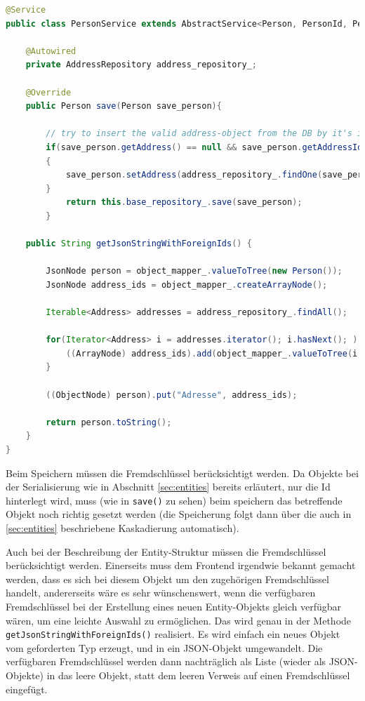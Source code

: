 \scriptsize
\begin{lstlisting}[caption=PersonService.java, label=cs:PersonService, language=Java]
@Service
public class PersonService extends AbstractService<Person, PersonId, PersonRepository>{

	@Autowired
	private AddressRepository address_repository_;
	
	@Override
	public Person save(Person save_person){
	
		// try to insert the valid address-object from the DB by it's id (from JSON)
		if(save_person.getAddress() == null && save_person.getAddressId() != null)
		{
			save_person.setAddress(address_repository_.findOne(save_person.getAddressId()));
		}
			return this.base_repository_.save(save_person);
		}
	
	public String getJsonStringWithForeignIds() {
	
		JsonNode person = object_mapper_.valueToTree(new Person());
		JsonNode address_ids = object_mapper_.createArrayNode();
		
		Iterable<Address> addresses = address_repository_.findAll();
		
		for(Iterator<Address> i = addresses.iterator(); i.hasNext(); ) {
			((ArrayNode) address_ids).add(object_mapper_.valueToTree(i.next().getId()));
		}
		
		((ObjectNode) person).put("Adresse", address_ids);
		
		return person.toString();
	}
}
\end{lstlisting}
\normalsize

Beim Speichern müssen die Fremdschlüssel berücksichtigt werden. Da Objekte bei der Serialisierung wie in Abschnitt \ref{sec:entities} bereits erläutert, nur die Id hinterlegt wird, muss (wie in \verb|save()| zu sehen) beim speichern das betreffende Objekt noch richtig gesetzt werden (die Speicherung folgt dann über die auch in \ref{sec:entities} beschriebene Kaskadierung automatisch).

Auch bei der Beschreibung der Entity-Struktur müssen die Fremdschlüssel berücksichtigt werden. Einerseits muss dem Frontend irgendwie bekannt gemacht werden, dass es sich bei diesem Objekt um den zugehörigen Fremdschlüssel handelt, andererseits wäre es sehr wünschenswert, wenn die verfügbaren Fremdschlüssel bei der Erstellung eines neuen Entity-Objekts gleich verfügbar wären, um eine leichte Auswahl zu ermöglichen. Das wird genau in der Methode  \verb|getJsonStringWithForeignIds()| realisiert. Es wird einfach ein neues Objekt vom geforderten Typ erzeugt, und in ein JSON-Objekt umgewandelt. Die verfügbaren Fremdschlüssel werden dann nachträglich als Liste (wieder als JSON-Objekte) in das leere Objekt, statt dem leeren Verweis auf einen Fremdschlüssel eingefügt. 
